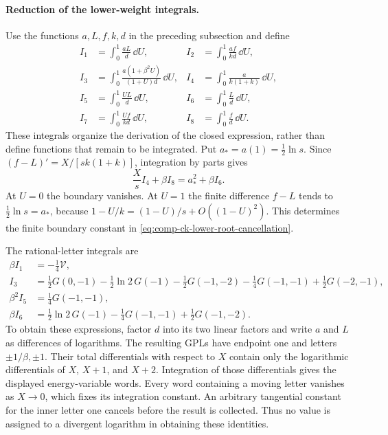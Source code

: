 \paragraph{Reduction of the lower-weight integrals.} Use the functions
$a,L,f,k,d$ in the preceding subsection and define
\begin{align}
 I_1&=\int_0^1\frac{aL}{d}\,\dd U,&
 I_2&=\int_0^1\frac{af}{kd}\,\dd U,\\
 I_3&=\int_0^1\frac{a(1+\beta^2U)}{(1+U)d}\,\dd U,&
 I_4&=\int_0^1\frac{a}{k(1+k)}\,\dd U,\\
 I_5&=\int_0^1\frac{UL}{d}\,\dd U,&
 I_6&=\int_0^1\frac{L}{d}\,\dd U,\\
 I_7&=\int_0^1\frac{Uf}{kd}\,\dd U,&
 I_8&=\int_0^1\frac{f}{d}\,\dd U.
\end{align}
These integrals organize the derivation of the closed expression, rather
than define functions that remain to be integrated. Put
$a_*=a(1)=\tfrac12\ln s$. Since
$(f-L)'=X/[sk(1+k)]$, integration by parts gives
\begin{equation}
 \frac Xs I_4+\beta I_8=a_*^2+\beta I_6.
 \label{eq:comp-ck-lower-root-cancellation}
\end{equation}
At $U=0$ the boundary vanishes. At $U=1$ the finite difference
$f-L$ tends to $\tfrac12\ln s=a_*$, because
$1-U/k=(1-U)/s+O((1-U)^2)$. This determines the finite boundary
constant in \eqref{eq:comp-ck-lower-root-cancellation}.

The rational-letter integrals are
\begin{align}
 \beta I_1&=-\tfrac14\mathcal V,\\
 I_3&=\tfrac12G(0,-1)-\tfrac12\ln2\,G(-1)
       -\tfrac12G(-1,-2)-\tfrac14G(-1,-1)+\tfrac12G(-2,-1),\\
 \beta^2 I_5&=\tfrac14G(-1,-1),\\
 \beta I_6&=\tfrac12\ln2\,G(-1)-\tfrac14G(-1,-1)
                    +\tfrac12G(-1,-2).
\end{align}
To obtain these expressions, factor $d$ into its two linear factors
and write $a$ and $L$ as differences of logarithms. The resulting GPLs
have endpoint one and letters $\pm1/\beta,\pm1$. Their total
differentials with respect to $X$ contain only the logarithmic
differentials of $X$, $X+1$, and $X+2$. Integration of those
differentials gives the displayed energy-variable words. Every word
containing a moving letter vanishes as $X\to0$, which fixes its
integration constant. An arbitrary tangential constant for the inner
letter one cancels before the result is collected. Thus no value is
assigned to a divergent logarithm in obtaining these identities.

